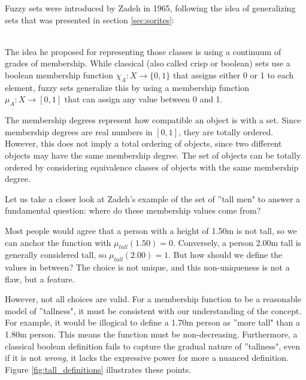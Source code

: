 Fuzzy sets were introduced by Zadeh in 1965, following the idea of generalizing sets that was presented in section \ref{sec:sorites}:

\cite{Zadeh1965}\\

The idea he proposed for representing those classes is using a continuum of grades of membership. While classical (also called crisp or boolean) sets use a boolean membership function $\chi_A:X\rightarrow\{0,1\}$ that assigns either 0 or 1 to each element, fuzzy sets generalize this by using a membership function $\mu_A:X\rightarrow[0,1]$ that can assign any value between 0 and 1. 

\begin{remark}
    The membership degrees represent how compatible an object is with a set. Since membership degrees are real numbers in $[0,1]$, they are totally ordered. However, this does not imply a total ordering of objects, since two different objects may have the same membership degree. The set of objects can be totally ordered by considering equivalence classes of objects with the same membership degree.
\end{remark}

Let us take a closer look at Zadeh's example of the set of ''tall men" to answer a fundamental question: where do these membership values come from?

Most people would agree that a person with a height of 1.50m is not tall, so we can anchor the function with $\mu_{tall}(1.50) = 0$. Conversely, a person 2.00m tall is generally considered tall, so $\mu_{tall}(2.00) = 1$. But how should we define the values in between? The choice is not unique, and this non-uniqueness is not a flaw, but a feature.

However, not all choices are valid. For a membership function to be a reasonable model of ''tallness", it must be consistent with our understanding of the concept. For example, it would be illogical to define a 1.70m person as ''more tall" than a 1.80m person. This means the function must be non-decreasing. Furthermore, a classical boolean definition fails to capture the gradual nature of ''tallness", even if it is not \emph{wrong}, it lacks the expressive power for more a nuanced definition. Figure \ref{fig:tall_definitions} illustrates these points.

